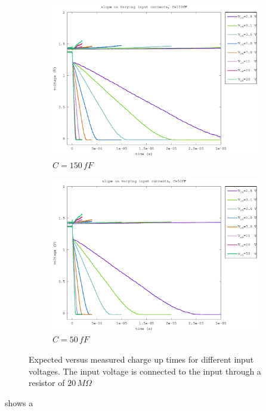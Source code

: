 \documentclass{article}
\begin{document}
\begin{figure}[h]
\begin{subfigure}[b]{0.475\textwidth}
	    \includegraphics[width=\textwidth]{fig/slope_150fF.eps}
	    \caption[]%
	    {$C=150\,fF$}    
	    \label{fig:slopes_150fF}
	\end{subfigure}
	\quad
	\begin{subfigure}[b]{0.475\textwidth}   
	    \centering 
	    \includegraphics[width=\textwidth]{fig/slope_50fF.eps}
	    \caption[]%
	    {$C=50\,fF$}    
	    \label{fig:slopes_50fF}
	\end{subfigure}
	\caption{Expected versus measured charge up times for different input voltages. The input voltage is connected to the input through a resistor of $20\,M\Omega$}
	\label{fig:slopes}
\end{figure}

 shows a 
\end{document}
